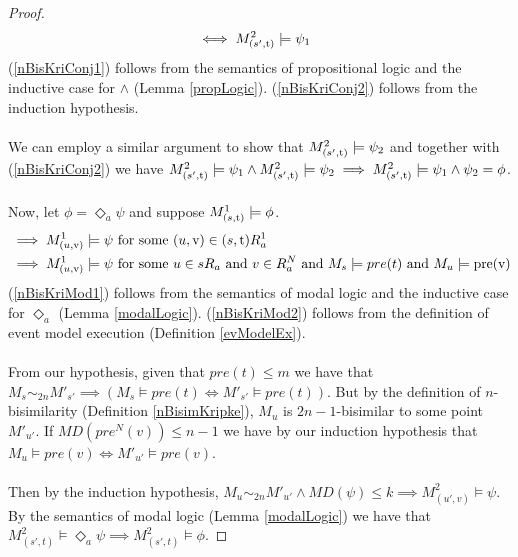 \begin{proof}
\begin{align}
	& \iff M^2_{(s', \mathrm{t} )} \models \psi_1 \label{nBisKriConj2}
\end{align}
(\ref{nBisKriConj1}) follows from the semantics of propositional logic and the inductive case for
$\land$ (Lemma \ref{propLogic}).
(\ref{nBisKriConj2}) follows from the induction hypothesis.\\
\\
We can employ a similar argument to show that $M^2_{(s', \mathrm{t} )} \models \psi_2$ and together with
(\ref{nBisKriConj2}) we have $M^2_{(s', \mathrm{t} )} \models \psi_1 \land M^2_{(s', \mathrm{t} )} \models \psi_2 \implies
M^2_{(s', \mathrm{t} )} \models \psi_1 \land \psi_2 = \phi$.\\
\\
Now, let $\phi = \Diamond_a \psi$ and suppose $M^1_{(s, \mathrm{t} )} \models \phi$.
\begin{align}
	& \implies M^1_{(u, \mathrm{v} )} \models \psi \text{ for some $(u, \mathrm{v} ) \in (s, \mathrm{t} ) R^1_a$} \label{nBisKriMod1} \\
	& \implies M^1_{(u, \mathrm{v} )} \models \psi \text{ for some $u \in s R_a$ and $v \in R^N_a$ and $M_s
		\models pre(t)$ and $M_u \models  \mathrm{pre(v)} $} \label{nBisKriMod2}
\end{align}
(\ref{nBisKriMod1}) follows from the semantics of modal logic and the inductive case for
$\Diamond_a$ (Lemma \ref{modalLogic}).
(\ref{nBisKriMod2}) follows from the definition of event model execution (Definition
		\ref{evModelEx}).\\
\\
From our hypothesis, given that $pre(t) \leq m$ we have that $M_s \sim_{2n} M'_{s'} \implies (M_s \models pre(t) \iff M'_{s'} \models
pre(t))$.
But by the definition of $n$-bisimilarity (Definition \ref{nBisimKripke}), $M_u$ is
$2n-1$-bisimilar to some point $M'_{u'}$.
If $MD(pre^N(v)) \leq n-1$ we have by our induction hypothesis that $M_u \models pre(v) \iff M'_{u'}
\models pre(v)$.\\
\\
Then by the induction hypothesis, $M_u \sim_{2n} M'_{u'} \land MD(\psi) \leq k \implies
M^2_{(u',v)}  \models \psi$.
By the semantics of modal logic (Lemma \ref{modalLogic}) we have that $M^2_{(s',t)} \models
\Diamond_a \psi \implies M^2_{(s',t)} \models \phi$.
\end{proof}

